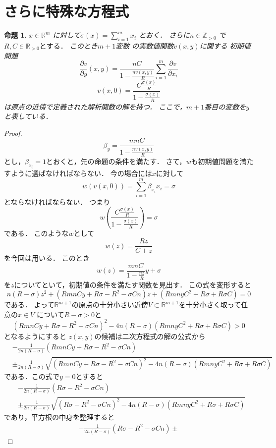 \documentclass[leqno, a4paper, 12pt]{jsarticle}
\newtheorem{prop}[thm]{命題}
\newcommand{\zz}{\mathbb{Z}}
\newcommand{\rr}{\mathbb{R}}
\begin{document}
\section{さらに特殊な方程式}
\begin{prop}
$x\in \rr^m$
に対して$\sigma(x)=\sum_{i=1}^mx_i$
とおく．
さらに$n\in \zz_{> 0}$
で$R, C\in \rr_{>0}とする．$
このとき$m+1$変数
の実数値関数$v(x, y)$に関する
初期値問題
\begin{equation}\label{eq:44}
\frac{\partial v}{\partial y}(x, y)=\frac{nC}{1-\frac{nv(x, y)}{R}}
\sum_{i=1}^m\frac{\partial v}{\partial x_i}
\end{equation}
\[
v(x, 0)=\frac{C\frac{\sigma(x)}{R}}{1-\frac{\sigma(x)}{R}}
\]
は原点の近傍で定義された解析関数の解を持つ．
ここで，$m+1$番目の変数を$y$と表している．
\end{prop}
\begin{proof}
\[
\beta_y=\frac{mnC}{1-\frac{nv(x, y)}{R}}
\]
とし，$\beta_{x_i}=1$とおくと，先の命題の条件を満たす．
さて，$w$も初期値問題を満たすように選ばなければならない．
今の場合には$x$に対して
\[
w(v(x, 0))=\sum_{i=1}^m\beta_{x_i}x_i=\sigma
\]
とならなければならない．
つまり
\[
w\left(\frac{C\frac{\sigma(x)}{R}}{1-\frac{\sigma(x)}{R}}
\right)=\sigma
\]
である．
このような$w$として
\[
w(z)=\frac{Rz}{C+z}
\]
を今回は用いる．
このとき
\[
w(z)=\frac{mnC}{1-\frac{nz}{R}}y+\sigma
\]
を$z$についてといて，初期値の条件を満たす関数を見出す．
この式を変形すると
\[
n(R-\sigma)z^2+(RmnCy+R\sigma-R^2-\sigma Cn)z+(RmnyC^2+R\sigma+R\sigma C)=0
\]
である．
よって$\rr^{m+1}$の原点の十分小さい近傍$V\subset \rr^{m+1}$を十分小さく取って任意の$x\in V$
について$R-\sigma>0$と
\[
(RmnCy+R\sigma-R^2-\sigma Cn)^2-4n(R-\sigma)(RmnyC^2+R\sigma+R\sigma C)>0
\]
となるようにすると
$z(x, y)$の候補は二次方程式の解の公式から
\begin{align*}
&-\frac{1}{2n(R-\sigma)}\left(RmnCy+R\sigma-R^2-\sigma Cn\right)\\
&\pm\frac{1}{2n(R-\sigma)}\sqrt{(RmnCy+R\sigma-R^2-\sigma Cn)^2-4n(R-\sigma)(RmnyC^2+R\sigma+R\sigma C)}
\end{align*}
である．この式で$y=0$とすると
\begin{align*}
&-\frac{1}{2n(R-\sigma)}\left(R\sigma-R^2-\sigma Cn\right)\\
&\pm\frac{1}{2n(R-\sigma)}\sqrt{(R\sigma-R^2-\sigma Cn)^2-4n(R-\sigma)(RmnyC^2+R\sigma+R\sigma C)}
\end{align*}
であり，平方根の中身を整理すると
\begin{align*}
-\frac{1}{2n(R-\sigma)}\left(R\sigma-R^2-\sigma Cn\right)\pm

\end{align*}
\end{proof}
\end{document}
